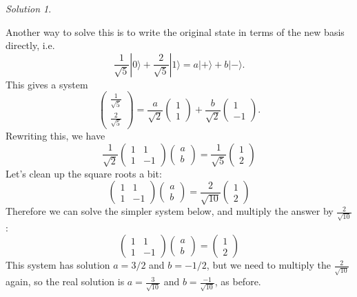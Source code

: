 \documentclass{article}
\theoremstyle{plain}
\theoremstyle{definition}
\theoremstyle{remark}
\newtheorem*{solution}{Solution}
\numberwithin{theorem}{section}
\begin{document}
\begin{solution}
\begin{enumerate}
	Another way to solve this is to write the original state in terms of the new basis directly, i.e.
	\[
		\frac{1}{\sqrt{5}} |0\rangle + \frac{2}{\sqrt{5}}|1\rangle = a |+ \rangle + b |- \rangle.
	\]
	This gives a system
	\[
		\begin{pmatrix}
			\frac{1}{\sqrt{5}} \\
			\frac{2}{\sqrt{5}}
		\end{pmatrix}
		=
		\frac{a}{\sqrt{2}} 
		\begin{pmatrix} 1 \\ 1 \end{pmatrix}
		+
		\frac{b}{\sqrt{2}}
		\begin{pmatrix} 1 \\ -1 \end{pmatrix}.
	\]
	Rewriting this, we have
	\[
		\frac{1}{\sqrt{2}}
		\begin{pmatrix}
			1 & 1 \\ 1 & -1 
		\end{pmatrix}
		\begin{pmatrix}
		a \\ b \end{pmatrix}
		=
		\frac{1}{\sqrt{5}}
		\begin{pmatrix}
		1 \\ 2 \end{pmatrix}
	\]
	Let's clean up the square roots a bit:
	\[
		\begin{pmatrix}
			1 & 1 \\ 1 & -1 
		\end{pmatrix}
		\begin{pmatrix}
		a \\ b \end{pmatrix}
		=
		\frac{2}{\sqrt{10}}
		\begin{pmatrix}
		1 \\ 2 \end{pmatrix}
	\]
	Therefore we can solve the simpler system below, and multiply the answer by $\frac{2}{\sqrt{10}}$:
	\[
		\begin{pmatrix}
			1 & 1 \\ 1 & -1 
		\end{pmatrix}
		\begin{pmatrix}
		a \\ b \end{pmatrix}
		=
		\begin{pmatrix}
		1 \\ 2 \end{pmatrix}
	\]
	This system has solution $a=3/2$ and $b=-1/2$, but we need to multiply the $\frac{2}{\sqrt{10}}$ again, so the real solution is $a = \frac{3}{\sqrt{10}}$ and $b = \frac{-1}{\sqrt{10}}$, as before.




\end{enumerate}

\end{solution}
\end{document}
